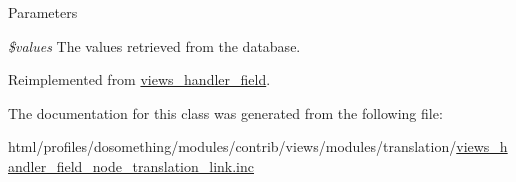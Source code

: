 \begin{DoxyParams}{Parameters}
\item[{\em \$values}]The values retrieved from the database. \end{DoxyParams}


Reimplemented from \hyperlink{classviews__handler__field_a82ff951c5e9ceb97b2eab86f880cbc1e}{views\_\-handler\_\-field}.

The documentation for this class was generated from the following file:\begin{DoxyCompactItemize}
\item 
html/profiles/dosomething/modules/contrib/views/modules/translation/\hyperlink{views__handler__field__node__translation__link_8inc}{views\_\-handler\_\-field\_\-node\_\-translation\_\-link.inc}\end{DoxyCompactItemize}
